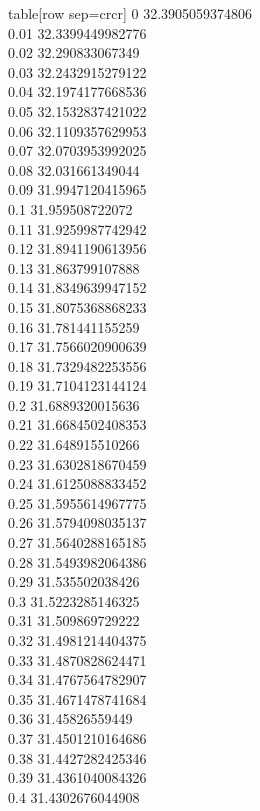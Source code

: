   table[row sep=crcr]{%
0	32.3905059374806\\
0.01	32.3399449982776\\
0.02	32.290833067349\\
0.03	32.2432915279122\\
0.04	32.1974177668536\\
0.05	32.1532837421022\\
0.06	32.1109357629953\\
0.07	32.0703953992025\\
0.08	32.031661349044\\
0.09	31.9947120415965\\
0.1	31.959508722072\\
0.11	31.9259987742942\\
0.12	31.8941190613956\\
0.13	31.863799107888\\
0.14	31.8349639947152\\
0.15	31.8075368868233\\
0.16	31.781441155259\\
0.17	31.7566020900639\\
0.18	31.7329482253556\\
0.19	31.7104123144124\\
0.2	31.6889320015636\\
0.21	31.6684502408353\\
0.22	31.648915510266\\
0.23	31.6302818670459\\
0.24	31.6125088833452\\
0.25	31.5955614967775\\
0.26	31.5794098035137\\
0.27	31.5640288165185\\
0.28	31.5493982064386\\
0.29	31.535502038426\\
0.3	31.5223285146325\\
0.31	31.509869729222\\
0.32	31.4981214404375\\
0.33	31.4870828624471\\
0.34	31.4767564782907\\
0.35	31.4671478741684\\
0.36	31.45826559449\\
0.37	31.4501210164686\\
0.38	31.4427282425346\\
0.39	31.4361040084326\\
0.4	31.4302676044908\\
}
